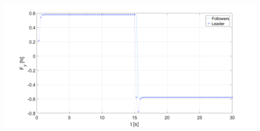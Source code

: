 \documentclass{beamer}
\begin{document}
\begin{frame}
\begin{columns}[c]
\centering
 \includegraphics[width=1\textwidth]{figures/CB_ANTS_Fy.png}
\end{columns}

\end{frame}

\end{document}
